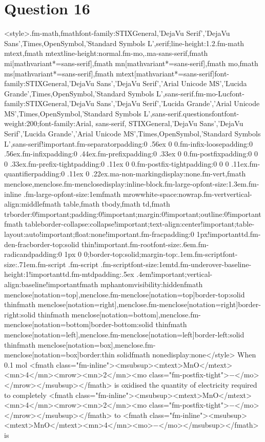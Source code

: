\documentclass{article}
\begin{document}
\section*{Question 16}
<style>.fm-math,fmath{font-family:STIXGeneral,'DejaVu Serif','DejaVu Sans',Times,OpenSymbol,'Standard Symbols L',serif;line-height:1.2}.fm-math mtext,fmath mtext{line-height:normal}.fm-mo,.ma-sans-serif,fmath mi[mathvariant*=sans-serif],fmath mn[mathvariant*=sans-serif],fmath mo,fmath ms[mathvariant*=sans-serif],fmath mtext[mathvariant*=sans-serif]{font-family:STIXGeneral,'DejaVu Sans','DejaVu Serif','Arial Unicode MS','Lucida Grande',Times,OpenSymbol,'Standard Symbols L',sans-serif}.fm-mo-Luc{font-family:STIXGeneral,'DejaVu Sans','DejaVu Serif','Lucida Grande','Arial Unicode MS',Times,OpenSymbol,'Standard Symbols L',sans-serif}.questionsfont{font-weight:200;font-family:Arial, sans-serif, STIXGeneral,'DejaVu Sans','DejaVu Serif','Lucida Grande','Arial Unicode MS',Times,OpenSymbol,'Standard Symbols L',sans-serif!important}.fm-separator{padding:0 .56ex 0 0}.fm-infix-loose{padding:0 .56ex}.fm-infix{padding:0 .44ex}.fm-prefix{padding:0 .33ex 0 0}.fm-postfix{padding:0 0 0 .33ex}.fm-prefix-tight{padding:0 .11ex 0 0}.fm-postfix-tight{padding:0 0 0 .11ex}.fm-quantifier{padding:0 .11ex 0 .22ex}.ma-non-marking{display:none}.fm-vert,fmath menclose,menclose.fm-menclose{display:inline-block}.fm-large-op{font-size:1.3em}.fm-inline .fm-large-op{font-size:1em}fmath mrow{white-space:nowrap}.fm-vert{vertical-align:middle}fmath table,fmath tbody,fmath td,fmath tr{border:0!important;padding:0!important;margin:0!important;outline:0!important}fmath table{border-collapse:collapse!important;text-align:center!important;table-layout:auto!important;float:none!important}.fm-frac{padding:0 1px!important}td.fm-den-frac{border-top:solid thin!important}.fm-root{font-size:.6em}.fm-radicand{padding:0 1px 0 0;border-top:solid;margin-top:.1em}.fm-script{font-size:.71em}.fm-script .fm-script .fm-script{font-size:1em}td.fm-underover-base{line-height:1!important}td.fm-mtd{padding:.5ex .4em!important;vertical-align:baseline!important}fmath mphantom{visibility:hidden}fmath menclose[notation=top],menclose.fm-menclose[notation=top]{border-top:solid thin}fmath menclose[notation=right],menclose.fm-menclose[notation=right]{border-right:solid thin}fmath menclose[notation=bottom],menclose.fm-menclose[notation=bottom]{border-bottom:solid thin}fmath menclose[notation=left],menclose.fm-menclose[notation=left]{border-left:solid thin}fmath menclose[notation=box],menclose.fm-menclose[notation=box]{border:thin solid}fmath none{display:none}</style> When 0.1 mol <fmath class="fm-inline"><msubsup><mtext>MnO</mtext><mn>4</mn><mrow><mn>2</mn><mo class="fm-postfix-tight">−</mo></mrow></msubsup></fmath> is oxidised the quantity of electricity required to completely <fmath class="fm-inline"><msubsup><mtext>MnO</mtext><mn>4</mn><mrow><mn>2</mn><mo class="fm-postfix-tight">−</mo></mrow></msubsup></fmath> to <fmath class="fm-inline"><msubsup><mtext>MnO</mtext><mn>4</mn><mo>−</mo></msubsup></fmath> is 
\end{document}
